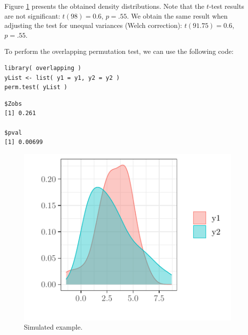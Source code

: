 \documentclass[twocolumn]{article}\usepackage[]{graphicx}\usepackage[]{xcolor}
\makeatletter
\def\maxwidth{ %
  \ifdim\Gin@nat@width>\linewidth
    \linewidth
  \else
    \Gin@nat@width
  \fi
}
\newenvironment{kframe}{%
 \def\at@end@of@kframe{}%
 \ifinner\ifhmode%
  \def\at@end@of@kframe{\end{minipage}}%
  \begin{minipage}{\columnwidth}%
 \fi\fi%
 \def\FrameCommand##1{\hskip\@totalleftmargin \hskip-\fboxsep
 \colorbox{shadecolor}{##1}\hskip-\fboxsep
     \hskip-\linewidth \hskip-\@totalleftmargin \hskip\columnwidth}%
 \MakeFramed {\advance\hsize-\width
   \@totalleftmargin\z@ \linewidth\hsize
   \@setminipage}}%
 {\par\unskip\endMakeFramed%
 \at@end@of@kframe}
\newenvironment{knitrout}{}{} %
\makeatother
\begin{document}
Figure \ref{fig:example} presents the obtained density distributions. Note that the $t$-test results are not significant: $t(98) = 0.6$, $p = .55$. We obtain the same result when adjusting the test for unequal variances (Welch correction): $t(91.75) = 0.6$, $p = .55$.

To perform the overlapping permutation test, we can use the following code:
\begin{knitrout}
\color{fgcolor}\begin{kframe}
\begin{verbatim}
library( overlapping ) 
yList <- list( y1 = y1, y2 = y2 ) 
perm.test( yList ) 
\end{verbatim}
\end{kframe} 
\begin{kframe}\begin{verbatim}
$Zobs
[1] 0.261

$pval
[1] 0.00699
\end{verbatim}
\end{kframe}
\end{knitrout}


\begin{knitrout}
\color{fgcolor}\begin{figure}

{\centering \includegraphics[width=\maxwidth]{figure/example-1} 

}

\caption[Simulated example]{Simulated example.}\label{fig:example}
\end{figure}

\end{knitrout}
\end{document}
